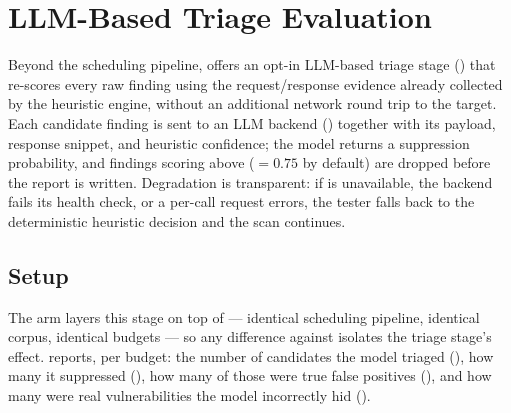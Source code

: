
\section{LLM-Based Triage Evaluation}
\label{sec:ai-triage}

Beyond the scheduling pipeline, \herramienta offers an opt-in LLM-based
triage stage () that re-scores every raw finding
using the request/response evidence already collected by the heuristic
engine, without an additional network round trip to the target. Each
candidate finding is sent to an LLM backend () together
with its payload, response snippet, and heuristic confidence; the model
returns a suppression probability, and findings scoring above
 ($=\num{0.75}$ by default) are dropped before the
report is written. Degradation is transparent: if  is
unavailable, the backend fails its health check, or a per-call request
errors, the tester falls back to the deterministic heuristic decision and the
scan continues.

\subsection{Setup}

The  arm layers this stage on top of  ---
identical scheduling pipeline, identical corpus, identical budgets --- so any
difference against  isolates the triage stage's effect.
 reports, per budget: the number of candidates the model
triaged (), how many it suppressed
(), how many of those were true false positives
(), and how many were real vulnerabilities the model
incorrectly hid ().

